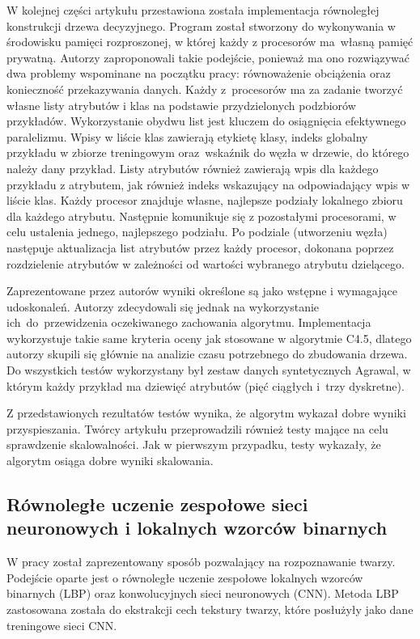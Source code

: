 \documentclass[12pt]{article}
\begin{document}
W kolejnej części artykułu przestawiona została implementacja równoległej konstrukcji drzewa decyzyjnego. Program został stworzony do wykonywania w środowisku pamięci
rozproszonej, w której każdy z procesorów ma~własną pamięć prywatną. Autorzy zaproponowali takie podejście, ponieważ ma ono rozwiązywać dwa problemy wspominane na
początku pracy: równoważenie obciążenia oraz konieczność przekazywania danych. Każdy z~procesorów ma za zadanie tworzyć własne listy atrybutów i klas na podstawie
przydzielonych podzbiorów przykładów. Wykorzystanie obydwu list jest kluczem do osiągnięcia efektywnego paralelizmu. Wpisy w liście klas zawierają etykietę klasy, indeks
globalny przykładu w zbiorze treningowym oraz~wskaźnik do węzła w drzewie, do którego należy dany przykład. Listy atrybutów również zawierają wpis dla każdego przykładu
z atrybutem, jak również indeks wskazujący na odpowiadający wpis w liście klas. Każdy procesor znajduje własne, najlepsze podziały lokalnego zbioru dla każdego atrybutu.
Następnie komunikuje się z pozostałymi procesorami, w celu ustalenia jednego, najlepszego podziału. Po podziale (utworzeniu węzła) następuje aktualizacja list atrybutów
przez każdy procesor, dokonana poprzez rozdzielenie atrybutów w zależności od wartości wybranego atrybutu dzielącego.

Zaprezentowane przez autorów wyniki określone są jako wstępne i wymagające udoskonaleń. Autorzy zdecydowali się jednak na wykorzystanie ich~do~przewidzenia oczekiwanego
zachowania algorytmu. Implementacja wykorzystuje takie same kryteria oceny jak stosowane w algorytmie C4.5, dlatego autorzy skupili się głównie na analizie czasu potrzebnego do
zbudowania drzewa. Do wszystkich testów wykorzystany był zestaw danych syntetycznych Agrawal, w którym każdy przykład ma dziewięć atrybutów (pięć ciągłych i~trzy dyskretne).

Z przedstawionych rezultatów testów wynika, że algorytm wykazał dobre wyniki przyspieszania. Twórcy artykułu przeprowadzili również testy mające na celu sprawdzenie skalowalności.
Jak w pierwszym przypadku, testy wykazały, że algorytm osiąga dobre wyniki skalowania.

\subsection{Równoległe uczenie zespołowe sieci neuronowych i lokalnych wzorców binarnych}

W pracy \cite{parallel-ensemble-learning} został zaprezentowany sposób pozwalający na rozpoznawanie twarzy.
Podejście oparte jest o równoległe uczenie zespołowe lokalnych wzorców binarnych (LBP) oraz konwolucyjnych sieci neuronowych (CNN). Metoda LBP zastosowana została
do ekstrakcji cech tekstury twarzy, które posłużyły jako dane treningowe sieci CNN.
\end{document}
